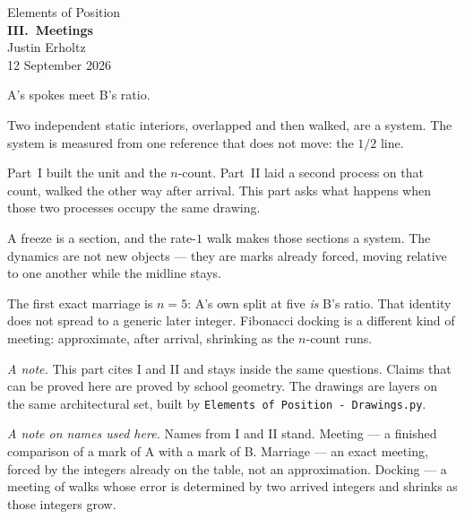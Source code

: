 \documentclass[10pt,a4paper]{article}
\theoremstyle{plain}
\theoremstyle{definition}
\begin{document}
\begin{center}
\vspace*{2.2em}
{\large Elements of Position}\\[1.6em]
{\LARGE\bfseries III.\ Meetings}\\[2.2em]
{\normalsize Justin Erholtz}\\[0.35em]
{\small 12 September 2026}
\end{center}

\vspace{2.4em}

\begin{center}
{\large A's spokes meet B's ratio.}
\end{center}

\vspace{1.8em}

\noindent
Two independent static interiors, overlapped and then walked, are a system.
The system is measured from one reference that does not move: the $1/2$ line.

Part~I built the unit and the $n$-count.
Part~II laid a second process on that count, walked the other way after arrival.
This part asks what happens when those two processes occupy the same drawing.

A freeze is a section, and the rate-$1$ walk makes those sections a system.
The dynamics are not new objects --- they are marks already forced, moving relative to one another while the midline stays.

The first exact marriage is $n=5$: A's own split at five \emph{is} B's ratio.
That identity does not spread to a generic later integer.
Fibonacci docking is a different kind of meeting: approximate, after arrival, shrinking as the $n$-count runs.

\vspace{1.4em}

\noindent
\textit{A note.}
This part cites I and II and stays inside the same questions.
Claims that can be proved here are proved by school geometry.
The drawings are layers on the same architectural set, built by \texttt{Elements of Position - Drawings.py}.

\vspace{0.9em}
\noindent
\textit{A note on names used here.}
Names from I and II stand.
Meeting --- a finished comparison of a mark of A with a mark of B.
Marriage --- an exact meeting, forced by the integers already on the table, not an approximation.
Docking --- a meeting of walks whose error is determined by two arrived integers and shrinks as those integers grow.
\end{document}
